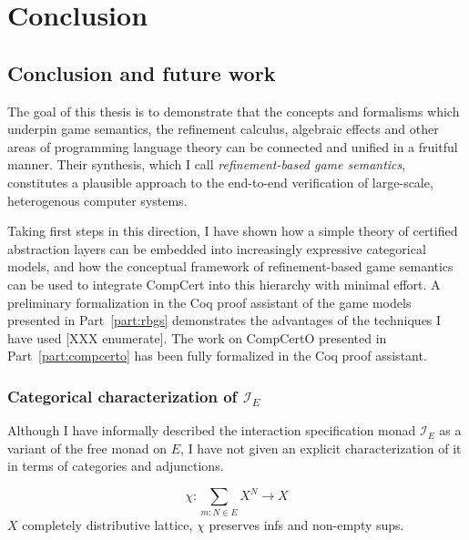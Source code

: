 \documentclass[draft,11pt]{report}
\theoremstyle{definition}
\begin{document}



\part{Conclusion}

\chapter{Conclusion and future work} %

The goal of this thesis is to demonstrate that
the concepts and formalisms which underpin
game semantics,
the refinement calculus,
algebraic effects and 
other areas of programming language theory
can be connected and unified in a fruitful manner.
Their synthesis,
which I call \emph{refinement-based game semantics},
constitutes
a plausible approach to the end-to-end verification
of large-scale, heterogenous computer systems.

Taking first steps in this direction,
I have shown how a simple theory of certified abstraction layers
can be embedded into increasingly expressive categorical models,
and how the conceptual framework of refinement-based game semantics
can be used to integrate CompCert into this hierarchy
with minimal effort.
A preliminary formalization in the Coq proof assistant
of the game models presented in Part~\ref{part:rbgs}
demonstrates the advantages of the techniques I have used
[XXX enumerate].
The work on CompCertO presented in Part~\ref{part:compcerto}
has been fully formalized in the Coq proof assistant.

\section{Categorical characterization of $\mathcal{I}_E$}

Although I have informally described
the interaction specification monad $\mathcal{I}_E$
as a variant of the free monad on $E$,
I have not given an explicit characterization of it
in terms of categories and adjunctions.

\[
  \chi : \sum_{m:N \in E} X^N \rightarrow X
\]
$X$ completely distributive lattice,
$\chi$ preserves infs and non-empty sups.
\end{document}
